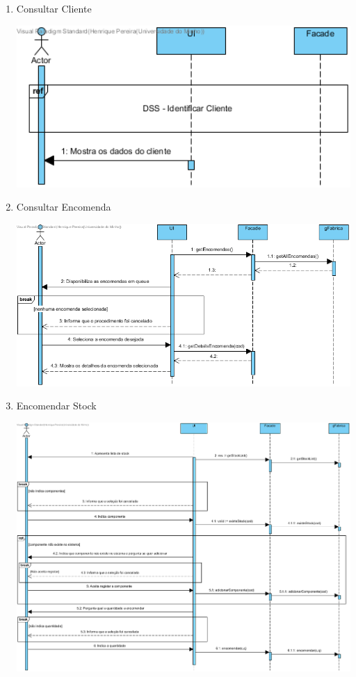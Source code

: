 \documentclass[11pt]{article} %
\begin{document}
\begin{enumerate}
\begin{center}
		\end{center}
	\item Consultar Cliente
		\begin{center}
 			\includegraphics[width = 6in]{dsss_consultar_cliente.png}
		\end{center}
	\item Consultar Encomenda
		\begin{center}
 			\includegraphics[width = 6in]{dsss_consultar_encomenda.png}
		\end{center}
	\item Encomendar Stock
		\begin{center}
 			\includegraphics[width = 6in]{dsss_encomendar_stock.png}

\end{center}
\end{enumerate}
\end{document}
